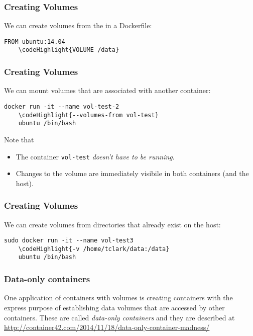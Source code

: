 \documentclass[10pt]{beamer}
\newcommand\codeHighlight[1]{\textcolor[rgb]{1,0,0}{\textbf{#1}}}
\begin{document}
\begin{frame}[fragile]
	\frametitle{Creating Volumes}
	We can create volumes from the in a Dockerfile:
	
	\begin{Verbatim}[commandchars=\\\{\}]
	FROM ubuntu:14.04
	\codeHighlight{VOLUME /data}
	\end{Verbatim}
\end{frame}

\begin{frame}[fragile]
	\frametitle{Creating Volumes}
	We can mount volumes that are associated with another container:
	
	\begin{Verbatim}[commandchars=\\\{\}]
	docker run -it --name vol-test-2 
	\codeHighlight{--volumes-from vol-test} 
	ubuntu /bin/bash
	\end{Verbatim}
	
	Note that 
	\begin{itemize}
		\item The container \texttt{vol-test} \emph{doesn't have to be running}.
		\item Changes to the volume are immediately visibile in both containers (and the host).
	\end{itemize}
\end{frame}

\begin{frame}[fragile]
	\frametitle{Creating Volumes}
	We can create volumes from directories that already exist on the host:
	
	\begin{Verbatim}[commandchars=\\\{\}]
	sudo docker run -it --name vol-test3 
	\codeHighlight{-v /home/tclark/data:/data} 
	ubuntu /bin/bash
	\end{Verbatim}
\end{frame}


\begin{frame}
	\frametitle{Data-only containers}
	
	One application of containers with volumes is creating containers with the express purpose of establishing data volumes that are accessed by other containers.  These are called \emph{data-only containers} and they are described at \\
	 \mbox{\url{http://container42.com/2014/11/18/data-only-container-madness/}}
\end{frame}
\end{document}

